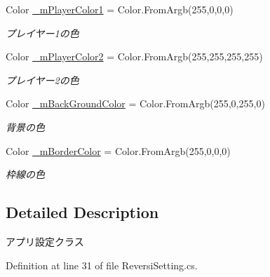 \begin{DoxyCompactItemize}
\mbox{\label{class_reversi_form_1_1_reversi_setting_a42db0c3c8dc24b5a59899b753b298b7f}} 
Color \hyperlink{class_reversi_form_1_1_reversi_setting_a42db0c3c8dc24b5a59899b753b298b7f}{\+\_\+m\+Player\+Color1} = Color.\+From\+Argb(255,0,0,0)
\begin{DoxyCompactList}\small\item\em プレイヤー1の色 \end{DoxyCompactList}\item 
\mbox{\label{class_reversi_form_1_1_reversi_setting_aa05d618eb313f3bec7868a8913be1e8e}} 
Color \hyperlink{class_reversi_form_1_1_reversi_setting_aa05d618eb313f3bec7868a8913be1e8e}{\+\_\+m\+Player\+Color2} = Color.\+From\+Argb(255,255,255,255)
\begin{DoxyCompactList}\small\item\em プレイヤー2の色 \end{DoxyCompactList}\item 
\mbox{\label{class_reversi_form_1_1_reversi_setting_a8f3a3a6a1620c4b1c9f9198fb83e63b2}} 
Color \hyperlink{class_reversi_form_1_1_reversi_setting_a8f3a3a6a1620c4b1c9f9198fb83e63b2}{\+\_\+m\+Back\+Ground\+Color} = Color.\+From\+Argb(255,0,255,0)
\begin{DoxyCompactList}\small\item\em 背景の色 \end{DoxyCompactList}\item 
\mbox{\label{class_reversi_form_1_1_reversi_setting_ab2c4d637edfd8d833e61012763193e80}} 
Color \hyperlink{class_reversi_form_1_1_reversi_setting_ab2c4d637edfd8d833e61012763193e80}{\+\_\+m\+Border\+Color} = Color.\+From\+Argb(255,0,0,0)
\begin{DoxyCompactList}\small\item\em 枠線の色 \end{DoxyCompactList}\end{DoxyCompactItemize}


\subsection{Detailed Description}
アプリ設定クラス 

Definition at line 31 of file Reversi\+Setting.\+cs.



